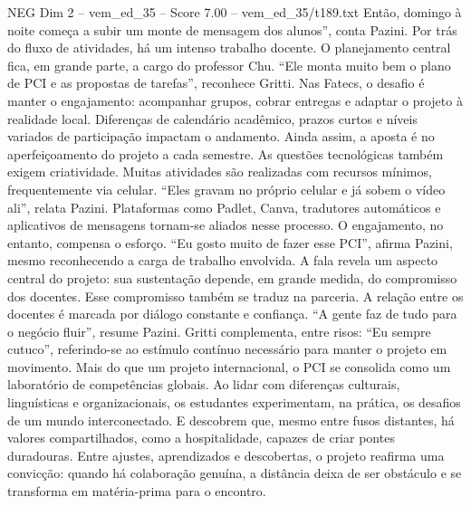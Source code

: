 \begin{textsample}{NEG Dim 2 – vem\_ed\_35 – Score 7.00 – vem\_ed\_35/t189.txt}
Então, domingo à noite começa a subir um monte de mensagem dos alunos”, conta Pazini.
Por trás do fluxo de atividades, há um intenso trabalho docente.
O planejamento central fica, em grande parte, a cargo do professor Chu. “Ele monta muito bem o plano de PCI e as propostas de tarefas”, reconhece Gritti.
Nas Fatecs, o desafio é manter o engajamento: acompanhar grupos, cobrar entregas e adaptar o projeto à realidade local.
Diferenças de calendário acadêmico, prazos curtos e níveis variados de participação impactam o andamento.
Ainda assim, a aposta é no aperfeiçoamento do projeto a cada semestre.
As questões tecnológicas também exigem criatividade.
Muitas atividades são realizadas com recursos mínimos, frequentemente via celular. “Eles gravam no próprio celular e já sobem o vídeo ali”, relata Pazini.
Plataformas como Padlet, Canva, tradutores automáticos e aplicativos de mensagens tornam-se aliados nesse processo.
O engajamento, no entanto, compensa o esforço. “Eu gosto muito de fazer esse PCI”, afirma Pazini, mesmo reconhecendo a carga de trabalho envolvida.
A fala revela um aspecto central do projeto: sua sustentação depende, em grande medida, do compromisso dos docentes.
Esse compromisso também se traduz na parceria.
A relação entre os docentes é marcada por diálogo constante e confiança. “A gente faz de tudo para o negócio fluir”, resume Pazini.
Gritti complementa, entre risos: “Eu sempre cutuco”, referindo-se ao estímulo contínuo necessário para manter o projeto em movimento.
Mais do que um projeto internacional, o PCI se consolida como um laboratório de competências globais.
Ao lidar com diferenças culturais, linguísticas e organizacionais, os estudantes experimentam, na prática, os desafios de um mundo interconectado.
E descobrem que, mesmo entre fusos distantes, há valores compartilhados, como a hospitalidade, capazes de criar pontes duradouras.
Entre ajustes, aprendizados e descobertas, o projeto reafirma uma convicção: quando há colaboração genuína, a distância deixa de ser obstáculo e se transforma em matéria-prima para o encontro.

\end{textsample}
